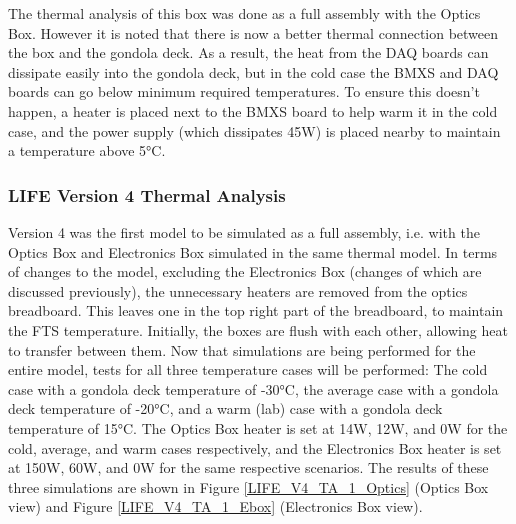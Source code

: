 The thermal analysis of this box was done as a full assembly with the Optics Box. However it is noted that there is now a better thermal connection between the box and the gondola deck. As a result, the heat from the DAQ boards can dissipate easily into the gondola deck, but in the cold case the BMXS and DAQ boards can go below minimum required temperatures. To ensure this doesn't happen, a heater is placed next to the BMXS board to help warm it in the cold case, and the power supply (which dissipates 45W) is placed nearby to maintain a temperature above 5°C.

\subsubsection{LIFE Version 4 Thermal Analysis}
Version 4 was the first model to be simulated as a full assembly, i.e. with the Optics Box and Electronics Box simulated in the same thermal model. In terms of changes to the model, excluding the Electronics Box (changes of which are discussed previously), the unnecessary heaters are removed from the optics breadboard. This leaves one in the top right part of the breadboard, to maintain the FTS temperature. Initially, the boxes are flush with each other, allowing heat to transfer between them. Now that simulations are being performed for the entire model, tests for all three temperature cases will be performed: The cold case with a gondola deck temperature of -30°C, the average case with a gondola deck temperature of -20°C, and a warm (lab) case with a gondola deck temperature of 15°C. The Optics Box heater is set at 14W, 12W, and 0W for the cold, average, and warm cases respectively, and the Electronics Box heater is set at 150W, 60W, and 0W for the same respective scenarios. The results of these three simulations are shown in Figure \ref{LIFE_V4_TA_1_Optics} (Optics Box view) and Figure \ref{LIFE_V4_TA_1_Ebox} (Electronics Box view).

